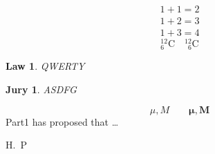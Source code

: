 \documentclass[11pt, oneside, a4paper]{article}
\newtheorem{law}{Law}[section]
\newtheorem{jury}{Jury}
\begin{document}
\begin{eqnarray}
    1 + 1 =2\\1 + 2 = 3 \\ 1 + 3 = 4
\end{eqnarray}
\begin{displaymath}
    {}^{12}_{6} \textrm{C} \quad {}^{12}_{\phantom{1}6} \textrm{C}
\end{displaymath}
\begin{law}
    QWERTY
\end{law}
\begin{jury}
    ASDFG
\end{jury}
\begin{displaymath}
    \mu, M \qquad \mathbf{\mu, M} 
\end{displaymath}
Part1 \cite{1} has proposed that \ldots
\begin{thebibliography}{86}
     H.~P
\end{thebibliography}
\end{document}
